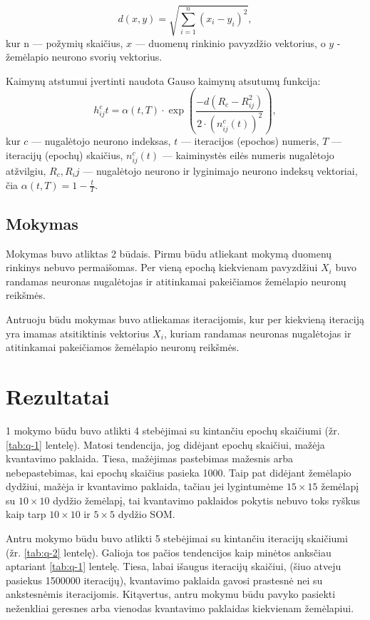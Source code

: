 \documentclass{VUMIFPSbakalaurinis}
\begin{document}
$$
d\left( x,y\right)   = \sqrt {\sum _{i=1}^{n}  \left( x_{i}-y_{i}\right)^2 } 
,$$
kur n — požymių skaičius, ${x}$ — duomenų 
rinkinio pavyzdžio vektorius, o ${y}$ - žemėlapio
neurono svorių vektorius.

Kaimynų atstumui įvertinti naudota Gauso kaimynų atsutumų funkcija:
$$
h_{ij}^{c}{t} = \alpha(t, T) \cdot \exp(\frac{-d(R_{c} - R_{ij}^2)}{2 \cdot (n_{ij}^c(t))^2})
,$$
kur $c$ — nugalėtojo neurono indeksas,
$t$ — iteracijos (epochos) numeris,
$T$ — iteracijų (epochų) skaičius,
$n_{ij}^c(t)$  — kaiminystės eilės numeris nugalėtojo atžvilgiu,
$R_c, R_ij$ — nugalėtojo neurono ir lyginimajo neurono indeksų vektoriai,
čia $\alpha(t, T) = 1 - \frac{t}{T}$.

\subsection{Mokymas}

Mokymas buvo atliktas 2 būdais. Pirmu būdu atliekant mokymą
duomenų rinkinys nebuvo permaišomas. Per vieną epochą
kiekvienam pavyzdžiui $X_i$ buvo randamas 
neuronas nugalėtojas ir atitinkamai pakeičiamos
žemėlapio neuronų reikšmės.

Antruoju būdu mokymas buvo atliekamas iteracijomis,
kur per kiekvieną iteraciją yra imamas atsitiktinis
vektorius $X_i$, kuriam randamas neuronas nugalėtojas
ir atitinkamai pakeičiamos žemėlapio neuronų reikšmės.


\section{Rezultatai}
1 mokymo būdu buvo atlikti 4 stebėjimai su kintančiu epochų
skaičiumi (žr. \ref{tab:q-1} lentelę). Matosi tendencija,
jog didėjant epochų skaičiui, mažėja kvantavimo paklaida.
Tiesa, mažėjimas pastebimas mažesnis arba nebepastebimas,
kai epochų skaičius pasieka 1000. Taip pat didėjant žemėlapio
dydžiui, mažėja ir kvantavimo paklaida, tačiau jei lygintumėme
$15 \times 15$ žemėlapį su $10 \times 10$ dydžio žemėlapį,
tai kvantavimo paklaidos pokytis nebuvo toks ryškus kaip
tarp $10 \times 10$ ir $5 \times 5$ dydžio SOM.

Antru mokymo būdu buvo atlikti 5 stebėjimai su kintančiu
iteracijų skaičiumi (žr. \ref{tab:q-2} lentelę). Galioja
tos pačios tendencijos kaip minėtos anksčiau aptariant 
\ref{tab:q-1} lentelę. Tiesa, labai išaugus iteracijų skaičiui,
(šiuo atveju pasiekus 1500000 iteracijų), kvantavimo paklaida
gavosi prastesnė nei su ankstesnėmis iteracijomis. Kitąvertus,
antru mokymu būdu pavyko pasiekti neženkliai geresnes arba vienodas
kvantavimo paklaidas kiekvienam žemėlapiui.
\end{document}
